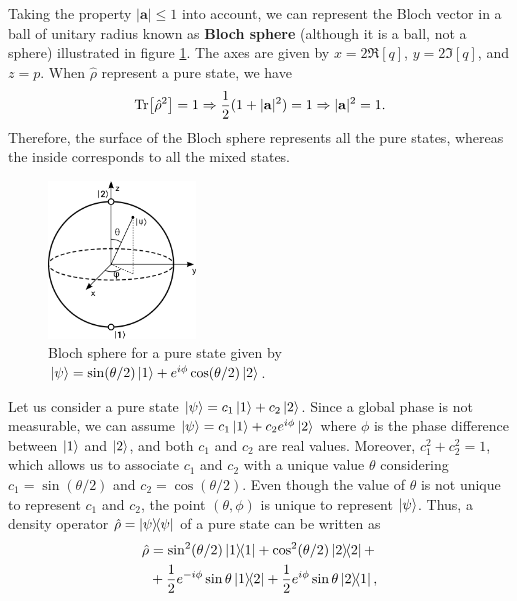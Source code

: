 Taking the property $ |\mathbf{a}| \leq 1 $ into account, we can represent the Bloch vector in a ball of unitary radius known as \textbf{Bloch sphere} (although it is a ball, not a sphere) illustrated in figure \ref{fig:Bloch-sphere}. The axes are given by $x = 2\Re[q]$, $ y = 2\Im[q] $, and $ z = p $. When $ \hat{\rho} $ represent a pure state, we have
\begin{equation}
	\Tr[\hat{\rho}^2] = 1 \Rightarrow \frac{1}{2}(1 + |\mathbf{a}|^2) = 1 \Rightarrow |\mathbf{a}|^2 = 1.
\end{equation}
Therefore, the surface of the Bloch sphere represents all the pure states, whereas the inside corresponds to all the mixed states.

\begin{figure}[!ht]
	\centering
	\includegraphics[width=0.35\textwidth]{USPSC-img/Bloch_sphere.png}
	\caption{Bloch sphere for a pure state given by $ \ket{\psi} = \sin(\theta/2) \ket{1} + e^{i\phi} \cos(\theta/2) \ket{2} $.}
	\label{fig:Bloch-sphere}
\end{figure}

Let us consider a pure state $ \ket{\psi} = c_1\ket{1} + c_2\ket{2} $. Since a global phase is not measurable, we can assume $ \ket{\psi} = c_1 \ket{1} + c_2 e^{i\phi} \ket{2} $ where $ \phi $ is the phase difference between $ \ket{1} $ and $ \ket{2} $, and both $ c_1 $ and $ c_2 $ are real values. Moreover, $ c_1^2 + c_2^2 = 1 $, which allows us to associate $ c_1 $ and $ c_2 $ with a unique value $ \theta $ considering $ c_1 = \sin{(\theta/2)} $ and $ c_2 = \cos{(\theta/2)} $. Even though the value of $ \theta $ is not unique to represent $ c_1 $ and $ c_2 $, the point $ (\theta, \phi) $ is unique to represent $ \ket{\psi} $. Thus, a density operator $ \hat{\rho} = \ketbra{\psi}{\psi} $ of a pure state can be written as
\begin{align}
	\hat{\rho} &= \sin^2(\theta/2) \ketbra{1}{1} + \cos^2(\theta/2) \ketbra{2}{2} + \nonumber
	\\
	&+ \frac{1}{2}e^{-i\phi}\sin\theta \ketbra{1}{2} + \frac{1}{2}e^{i\phi}\sin\theta \ketbra{2}{1},
\end{align}

